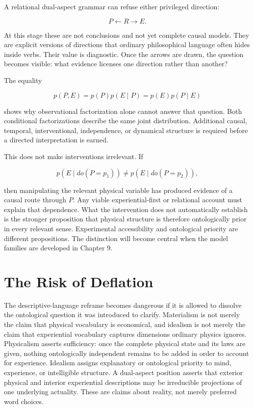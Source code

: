 A relational dual-aspect grammar can refuse either privileged direction:

\[
P\longleftarrow R\longrightarrow E.
\]

At this stage these are not conclusions and not yet complete causal models. They are explicit versions of directions that ordinary philosophical language often hides inside verbs. Their value is diagnostic. Once the arrows are drawn, the question becomes visible: what evidence licenses one direction rather than another?

The equality

\[
p(P,E)=p(P)p(E\mid P)=p(E)p(P\mid E)
\]

shows why observational factorization alone cannot answer that question. Both conditional factorizations describe the same joint distribution. Additional causal, temporal, interventional, independence, or dynamical structure is required before a directed interpretation is earned.

This does not make interventions irrelevant. If

\[
p(E\mid do(P=p_1))\neq p(E\mid do(P=p_2)),
\]

then manipulating the relevant physical variable has produced evidence of a causal route through $P$. Any viable experiential-first or relational account must explain that dependence. What the intervention does not automatically establish is the stronger proposition that physical structure is therefore ontologically prior in every relevant sense. Experimental accessibility and ontological priority are different propositions. The distinction will become central when the model families are developed in Chapter 9.

\section{The Risk of Deflation}

The descriptive-language reframe becomes dangerous if it is allowed to dissolve the ontological question it was introduced to clarify. Materialism is not merely the claim that physical vocabulary is economical, and idealism is not merely the claim that experiential vocabulary captures dimensions ordinary physics ignores. Physicalism asserts sufficiency: once the complete physical state and its laws are given, nothing ontologically independent remains to be added in order to account for experience. Idealism assigns explanatory or ontological priority to mind, experience, or intelligible structure. A dual-aspect position asserts that exterior physical and interior experiential descriptions may be irreducible projections of one underlying actuality. These are claims about reality, not merely preferred word choices.

